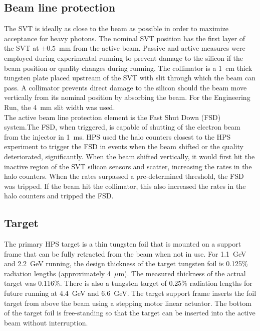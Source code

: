 \subsection{Beam line protection}
The SVT is ideally as close to the beam as possible in order to maximize acceptance for heavy photons. The nominal SVT position has the first layer of the SVT at $\pm0.5$~mm from the active beam. Passive and active measures were employed during experimental running to prevent damage to the silicon if the beam position or quality changes during running. The collimator is a 1~cm thick tungsten plate placed upstream of the SVT with slit through which the beam can pass. A collimator prevents direct damage to the silicon should the beam move vertically from its nominal position by absorbing the beam. For the Engineering Run, the 4~mm slit width was used. \\
\indent The active beam line protection element is the Fast Shut Down (FSD) system.The FSD, when triggered, is capable of shutting of the electron beam from the injector in 1~ms. HPS used the halo counters closest to the HPS experiment to trigger the FSD in events when the beam shifted or the quality deteriorated, significantly. When the beam shifted vertically, it would first hit the inactive region of the SVT silicon sensors and scatter, increasing the rates in the halo counters. When the rates surpassed a pre-determined threshold, the FSD was tripped. If the beam hit the collimator, this also increased the rates in the halo counters and tripped the FSD. 

\subsection{Target}

The primary HPS target is a thin tungsten foil that is mounted on a support frame that can be fully retracted from the beam when not in use. For 1.1~GeV and 2.2~GeV running, the design thickness of the target tungsten foil is 0.125$\%$ radiation lengths (approximately 4~$\mu$m). The measured thickness of the actual target was 0.116$\%$. There is also a tungsten target of 0.25$\%$ radiation lengths for future running at 4.4~GeV and 6.6~GeV. The target support frame inserts the foil target from above the beam using a stepping motor linear actuator. The bottom of the target foil is free-standing so that the target can be inserted into the active beam without interruption.   
